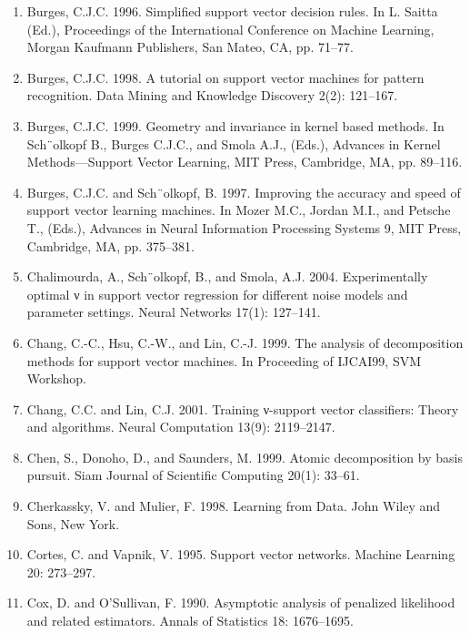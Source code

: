 \documentclass[fleqn,10pt]{olplainarticle}
\begin{document}
\begin{enumerate}
    \item Burges, C.J.C. 1996. Simplified support vector decision rules. In L. Saitta (Ed.), Proceedings of the International Conference on Machine Learning, Morgan Kaufmann Publishers, San Mateo, CA, pp. 71–77.

    \item Burges, C.J.C. 1998. A tutorial on support vector machines for pattern recognition. Data Mining and Knowledge Discovery 2(2): 121–167.

    \item Burges, C.J.C. 1999. Geometry and invariance in kernel based methods. In Sch¨olkopf B., Burges C.J.C., and Smola A.J., (Eds.), Advances in Kernel Methods—Support Vector Learning, MIT Press, Cambridge, MA, pp. 89–116.

    \item Burges, C.J.C. and Sch¨olkopf, B. 1997. Improving the accuracy and speed of support vector learning machines. In Mozer M.C., Jordan M.I., and Petsche T., (Eds.), Advances in Neural Information Processing Systems 9, MIT Press, Cambridge, MA, pp. 375–381.

    \item Chalimourda, A., Sch¨olkopf, B., and Smola, A.J. 2004. Experimentally optimal ν in support vector regression for different noise models and parameter settings. Neural Networks 17(1): 127–141.

    \item Chang, C.-C., Hsu, C.-W., and Lin, C.-J. 1999. The analysis of decomposition methods for support vector machines. In Proceeding of IJCAI99, SVM Workshop.

    \item Chang, C.C. and Lin, C.J. 2001. Training ν-support vector classifiers: Theory and algorithms. Neural Computation 13(9): 2119–2147.

    \item Chen, S., Donoho, D., and Saunders, M. 1999. Atomic decomposition by basis pursuit. Siam Journal of Scientific Computing 20(1): 33–61.

    \item Cherkassky, V. and Mulier, F. 1998. Learning from Data. John Wiley and Sons, New York.

    \item Cortes, C. and Vapnik, V. 1995. Support vector networks. Machine Learning 20: 273–297.

    \item Cox, D. and O’Sullivan, F. 1990. Asymptotic analysis of penalized likelihood and related estimators. Annals of Statistics 18: 1676–1695.


\end{enumerate}
\end{document}
